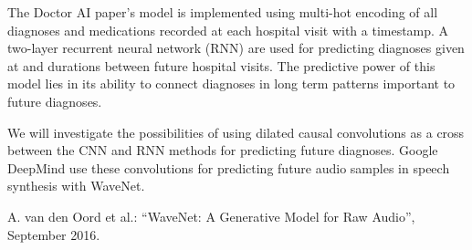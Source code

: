 The Doctor AI paper’s model is implemented using multi-hot encoding of all diagnoses and medications recorded at each hospital visit with a timestamp. A two-layer recurrent neural network (RNN) are used for predicting diagnoses given at and durations between future hospital visits. The predictive power of this model lies in its ability to connect diagnoses in long term patterns important to future diagnoses.

We will investigate the possibilities of using dilated causal convolutions as a cross between the CNN and RNN methods for predicting future diagnoses. Google DeepMind use these convolutions for predicting future audio samples in speech synthesis with WaveNet.

A. van den Oord et al.: “WaveNet: A Generative Model for Raw Audio”, September 2016.
